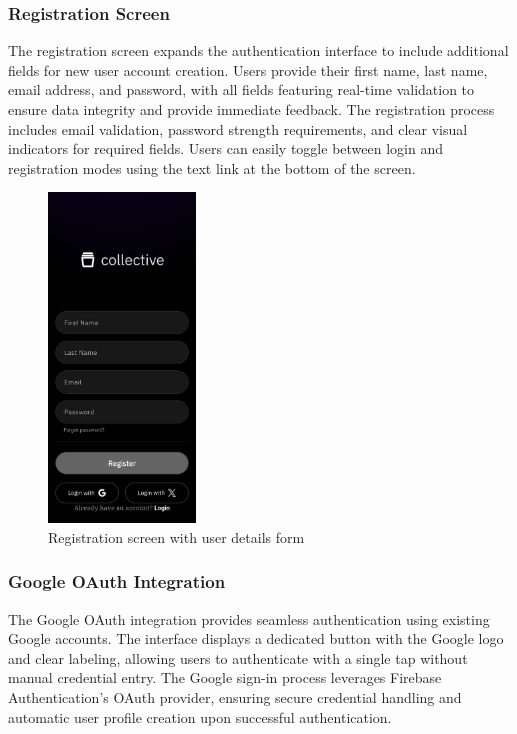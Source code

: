 \subsubsection{Registration Screen}

The registration screen expands the authentication interface to include additional fields for new user account creation. Users provide their first name, last name, email address, and password, with all fields featuring real-time validation to ensure data integrity and provide immediate feedback. The registration process includes email validation, password strength requirements, and clear visual indicators for required fields. Users can easily toggle between login and registration modes using the text link at the bottom of the screen.

\begin{samepage}
\begin{figure}[H]
\centering
\includegraphics[width=0.35\textwidth]{files/imgs/prototype/auth_register.jpeg}
\caption{Registration screen with user details form}
\label{fig:registration-screen}
\end{figure}
\end{samepage}

\subsubsection{Google OAuth Integration}

The Google OAuth integration provides seamless authentication using existing Google accounts. The interface displays a dedicated button with the Google logo and clear labeling, allowing users to authenticate with a single tap without manual credential entry. The Google sign-in process leverages Firebase Authentication's OAuth provider, ensuring secure credential handling and automatic user profile creation upon successful authentication.


